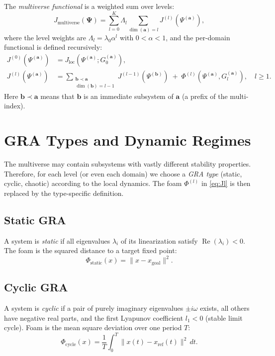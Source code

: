 \documentclass[12pt,a4paper]{article}
\begin{document}
The \emph{multiverse functional} is a weighted sum over levels:
\begin{equation}\label{eq:Jtotal}
J_{\text{multiverse}}(\mathbf{\Psi}) = \sum_{l=0}^{K} \Lambda_l \sum_{\dim(\mathbf{a})=l} J^{(l)}(\Psi^{(\mathbf{a})}),
\end{equation}
where the level weights are $\Lambda_l = \lambda_0 \alpha^l$ with $0<\alpha<1$, and the per-domain functional is defined recursively:
\begin{align}
J^{(0)}(\Psi^{(\mathbf{a})}) &= J_{\text{loc}}(\Psi^{(\mathbf{a})}; G_0^{(\mathbf{a})}),\label{eq:J0}\\
J^{(l)}(\Psi^{(\mathbf{a})}) &= \sum_{\substack{\mathbf{b}\prec\mathbf{a}\\ \dim(\mathbf{b})=l-1}} J^{(l-1)}(\Psi^{(\mathbf{b})}) \;+\; \Phi^{(l)}(\Psi^{(\mathbf{a})}, G_l^{(\mathbf{a})}),\quad l\ge 1.\label{eq:Jl}
\end{align}
Here $\mathbf{b}\prec\mathbf{a}$ means that $\mathbf{b}$ is an immediate subsystem of $\mathbf{a}$ (a prefix of the multi-index).

\section{GRA Types and Dynamic Regimes}
The multiverse may contain subsystems with vastly different stability properties. Therefore, for each level (or even each domain) we choose a \emph{GRA type} (static, cyclic, chaotic) according to the local dynamics. The foam $\Phi^{(l)}$ in \eqref{eq:Jl} is then replaced by the type-specific definition.

\subsection{Static GRA}
A system is \emph{static} if all eigenvalues $\lambda_i$ of its linearization satisfy $\operatorname{Re}(\lambda_i)<0$. The foam is the squared distance to a target fixed point:
\begin{equation}
\Phi_{\text{static}}(x) = \|x - x_{\text{goal}}\|^2.
\end{equation}

\subsection{Cyclic GRA}
A system is \emph{cyclic} if a pair of purely imaginary eigenvalues $\pm i\omega$ exists, all others have negative real parts, and the first Lyapunov coefficient $l_1<0$ (stable limit cycle). Foam is the mean square deviation over one period $T$:
\begin{equation}
\Phi_{\text{cycle}}(x) = \frac{1}{T}\int_0^T \|x(t) - x_{\text{ref}}(t)\|^2\,dt.
\end{equation}
\end{document}
